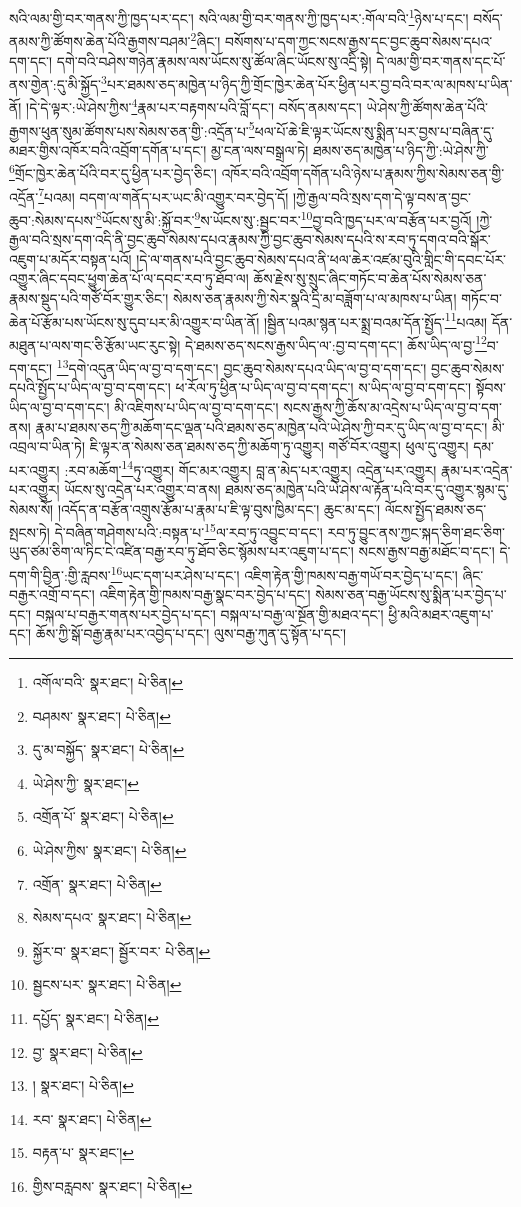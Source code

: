 སའི་ལམ་གྱི་བར་གནས་ཀྱི་ཁྱད་པར་དང་། སའི་ལམ་གྱི་བར་གནས་ཀྱི་ཁྱད་པར་:གོལ་བའི་\footnote{འགོལ་བའི་  སྣར་ཐང་།  པེ་ཅིན། }ཉེས་པ་དང་། བསོད་ནམས་ཀྱི་ཚོགས་ཆེན་པོའི་རྒྱགས་བཤམ་\footnote{བཤམས་  སྣར་ཐང་།  པེ་ཅིན། }ཞིང་། བསོགས་པ་དག་ཀྱང་སངས་རྒྱས་དང་བྱང་ཆུབ་སེམས་དཔའ་དག་དང་། དགེ་བའི་བཤེས་གཉེན་རྣམས་ལས་ཡོངས་སུ་ཚོལ་ཞིང་ཡོངས་སུ་འདྲི་སྟེ། དེ་ལམ་གྱི་བར་གནས་དང་པོ་ནས་གྱེན་:དུ་མི་སྐྱོད་\footnote{དུ་མ་བསྐྱོད་  སྣར་ཐང་།  པེ་ཅིན། }པར་ཐམས་ཅད་མཁྱེན་པ་ཉིད་ཀྱི་གྲོང་ཁྱེར་ཆེན་པོར་ཕྱིན་པར་བྱ་བའི་བར་ལ་མཁས་པ་ཡིན་ནོ། །དེ་དེ་ལྟར་:ཡེ་ཤེས་ཀྱིས་\footnote{ཡེ་ཤེས་ཀྱི་  སྣར་ཐང་། }རྣམ་པར་བརྟགས་པའི་བློ་དང་། བསོད་ནམས་དང་། ཡེ་ཤེས་ཀྱི་ཚོགས་ཆེན་པོའི་རྒྱགས་ཕུན་སུམ་ཚོགས་པས་སེམས་ཅན་གྱི་:འདྲོན་པ་\footnote{འགྲོན་པོ་  སྣར་ཐང་།  པེ་ཅིན། }ཕལ་པོ་ཆེ་ཇི་ལྟར་ཡོངས་སུ་སྨིན་པར་བྱས་པ་བཞིན་དུ་མཐར་གྱིས་འཁོར་བའི་འབྲོག་དགོན་པ་དང་། མྱ་ངན་ལས་བསྒྲལ་ཏེ། ཐམས་ཅད་མཁྱེན་པ་ཉིད་ཀྱི་:ཡེ་ཤེས་ཀྱི་\footnote{ཡེ་ཤེས་ཀྱིས་  སྣར་ཐང་།  པེ་ཅིན། }གྲོང་ཁྱེར་ཆེན་པོའི་བར་དུ་ཕྱིན་པར་བྱེད་ཅིང་། འཁོར་བའི་འབྲོག་དགོན་པའི་ཉེས་པ་རྣམས་ཀྱིས་སེམས་ཅན་གྱི་འདྲོན་\footnote{འགྲོན་  སྣར་ཐང་།  པེ་ཅིན། }པའམ། བདག་ལ་གནོད་པར་ཡང་མི་འགྱུར་བར་བྱེད་དོ། །ཀྱེ་རྒྱལ་བའི་སྲས་དག་དེ་ལྟ་བས་ན་བྱང་ཆུབ་:སེམས་དཔས་\footnote{སེམས་དཔའ་  སྣར་ཐང་།  པེ་ཅིན། }ཡོངས་སུ་མི་:སྐྱོ་བར་\footnote{སྐྱོར་བ་  སྣར་ཐང་། སྦྱོར་བར་  པེ་ཅིན། }ས་ཡོངས་སུ་:སྦྱང་བར་\footnote{སྦྱངས་པར་  སྣར་ཐང་།  པེ་ཅིན། }བྱ་བའི་ཁྱད་པར་ལ་བརྩོན་པར་བྱའོ། །ཀྱེ་རྒྱལ་བའི་སྲས་དག་འདི་ནི་བྱང་ཆུབ་སེམས་དཔའ་རྣམས་ཀྱི་བྱང་ཆུབ་སེམས་དཔའི་ས་རབ་ཏུ་དགའ་བའི་སྒོར་འཇུག་པ་མདོར་བསྟན་པའོ། །དེ་ལ་གནས་པའི་བྱང་ཆུབ་སེམས་དཔའ་ནི་ཕལ་ཆེར་འཛམ་བུའི་གླིང་གི་དབང་པོར་འགྱུར་ཞིང་དབང་ཕྱུག་ཆེན་པོ་ལ་དབང་རབ་ཏུ་ཐོབ་ལ། ཆོས་རྗེས་སུ་སྲུང་ཞིང་གཏོང་བ་ཆེན་པོས་སེམས་ཅན་རྣམས་སྡུད་པའི་གཙོ་བོར་གྱུར་ཅིང་། སེམས་ཅན་རྣམས་ཀྱི་སེར་སྣའི་དྲི་མ་བཟློག་པ་ལ་མཁས་པ་ཡིན། གཏོང་བ་ཆེན་པོ་རྩོམ་པས་ཡོངས་སུ་དུབ་པར་མི་འགྱུར་བ་ཡིན་ནོ། །སྦྱིན་པའམ་སྙན་པར་སྨྲ་བའམ་དོན་སྤྱོད་\footnote{དཔྱོད་  སྣར་ཐང་།  པེ་ཅིན། }པའམ། དོན་མཐུན་པ་ལས་གང་ཅི་རྩོམ་ཡང་རུང་སྟེ། དེ་ཐམས་ཅད་སངས་རྒྱས་ཡིད་ལ་:བྱ་བ་དག་དང་། ཆོས་ཡིད་ལ་བྱ་\footnote{བྱ་  སྣར་ཐང་།  པེ་ཅིན། }བ་དག་དང་། \footnote{།    སྣར་ཐང་།  པེ་ཅིན། }དགེ་འདུན་ཡིད་ལ་བྱ་བ་དག་དང་། བྱང་ཆུབ་སེམས་དཔའ་ཡིད་ལ་བྱ་བ་དག་དང་། བྱང་ཆུབ་སེམས་དཔའི་སྤྱོད་པ་ཡིད་ལ་བྱ་བ་དག་དང་། ཕ་རོལ་ཏུ་ཕྱིན་པ་ཡིད་ལ་བྱ་བ་དག་དང་། ས་ཡིད་ལ་བྱ་བ་དག་དང་། སྟོབས་ཡིད་ལ་བྱ་བ་དག་དང་། མི་འཇིགས་པ་ཡིད་ལ་བྱ་བ་དག་དང་། སངས་རྒྱས་ཀྱི་ཆོས་མ་འདྲེས་པ་ཡིད་ལ་བྱ་བ་དག་ནས། རྣམ་པ་ཐམས་ཅད་ཀྱི་མཆོག་དང་ལྡན་པའི་ཐམས་ཅད་མཁྱེན་པའི་ཡེ་ཤེས་ཀྱི་བར་དུ་ཡིད་ལ་བྱ་བ་དང་། མི་འབྲལ་བ་ཡིན་ཏེ། ཇི་ལྟར་ན་སེམས་ཅན་ཐམས་ཅད་ཀྱི་མཆོག་ཏུ་འགྱུར། གཙོ་བོར་འགྱུར། ཕུལ་དུ་འགྱུར། དམ་པར་འགྱུར། :རབ་མཆོག་\footnote{རབ་  སྣར་ཐང་།  པེ་ཅིན། }ཏུ་འགྱུར། གོང་མར་འགྱུར། བླ་ན་མེད་པར་འགྱུར། འདྲེན་པར་འགྱུར། རྣམ་པར་འདྲེན་པར་འགྱུར། ཡོངས་སུ་འདྲེན་པར་འགྱུར་བ་ནས། ཐམས་ཅད་མཁྱེན་པའི་ཡེ་ཤེས་ལ་རྟོན་པའི་བར་དུ་འགྱུར་སྙམ་དུ་སེམས་སོ། །འདོད་ན་བརྩོན་འགྲུས་རྩོམ་པ་རྣམ་པ་ཇི་ལྟ་བུས་ཁྱིམ་དང་། ཆུང་མ་དང་། ལོངས་སྤྱོད་ཐམས་ཅད་སྤངས་ཏེ། དེ་བཞིན་གཤེགས་པའི་:བསྟན་པ་\footnote{བརྟན་པ་  སྣར་ཐང་། }ལ་རབ་ཏུ་འབྱུང་བ་དང་། རབ་ཏུ་བྱུང་ནས་ཀྱང་སྐད་ཅིག་ཐང་ཅིག་ཡུད་ཙམ་ཅིག་ལ་ཏིང་ངེ་འཛིན་བརྒྱ་རབ་ཏུ་ཐོབ་ཅིང་སྙོམས་པར་འཇུག་པ་དང་། སངས་རྒྱས་བརྒྱ་མཐོང་བ་དང་། དེ་དག་གི་བྱིན་:གྱི་རླབས་\footnote{གྱིས་བརླབས་  སྣར་ཐང་།  པེ་ཅིན། }ཡང་དག་པར་ཤེས་པ་དང་། འཇིག་རྟེན་གྱི་ཁམས་བརྒྱ་གཡོ་བར་བྱེད་པ་དང་། ཞིང་བརྒྱར་འགྲོ་བ་དང་། འཇིག་རྟེན་གྱི་ཁམས་བརྒྱ་སྣང་བར་བྱེད་པ་དང་། སེམས་ཅན་བརྒྱ་ཡོངས་སུ་སྨིན་པར་བྱེད་པ་དང་། བསྐལ་པ་བརྒྱར་གནས་པར་བྱེད་པ་དང་། བསྐལ་པ་བརྒྱ་ལ་སྔོན་གྱི་མཐའ་དང་། ཕྱི་མའི་མཐར་འཇུག་པ་དང་། ཆོས་ཀྱི་སྒོ་བརྒྱ་རྣམ་པར་འབྱེད་པ་དང་། ལུས་བརྒྱ་ཀུན་དུ་སྟོན་པ་དང་། 